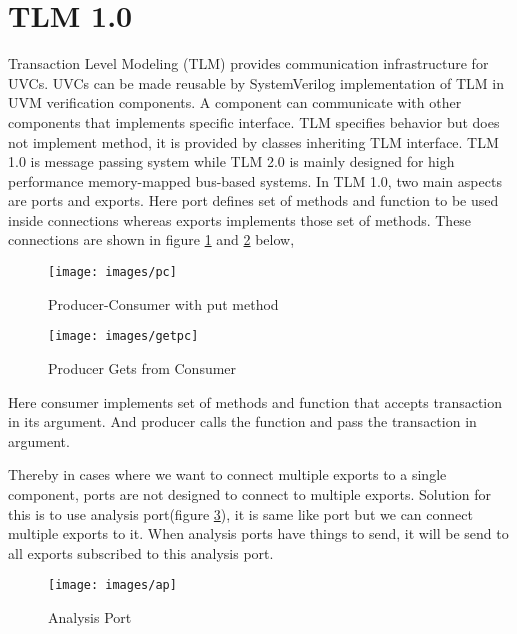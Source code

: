 \section{TLM 1.0}

Transaction Level Modeling (TLM) provides communication infrastructure for UVCs. UVCs can be made reusable by SystemVerilog implementation of TLM in UVM verification components. A component can communicate with other components that implements specific interface. TLM specifies behavior but does not implement method, it is provided by classes inheriting TLM interface. TLM 1.0 is message passing system while TLM 2.0 is mainly designed for high performance memory-mapped bus-based systems. In TLM 1.0, two main aspects are ports and exports. Here port defines set of methods and function to be used inside connections whereas exports implements those set of methods. These connections are shown in figure \ref{pc} and \ref{getpc} below,

\vspace{0.5cm}

\begin{figure}[ht]
	\centering
	\texttt{[image: images/pc]}
	\caption{Producer-Consumer with put method \label{pc}}
\end{figure}

\vspace{0.5cm}

\begin{figure}[ht]
	\centering
	\texttt{[image: images/getpc]}
	\caption{Producer Gets from Consumer \label{getpc}}
\end{figure}



Here consumer implements set of methods and function that accepts transaction in its argument. And producer calls the function and pass the transaction in argument. \par
Thereby in cases where we want to connect multiple exports to a single component, ports are not designed to connect to multiple exports. Solution for this is to use analysis port(figure \ref{ap}), it is same like port but we can connect multiple exports to it. When analysis ports have things to send, it will be send to all exports subscribed to this analysis port.

\vspace{0.5cm}

\begin{figure}[h]
	\centering
	\texttt{[image: images/ap]}
	\caption{Analysis Port \label{ap}}
\end{figure}

